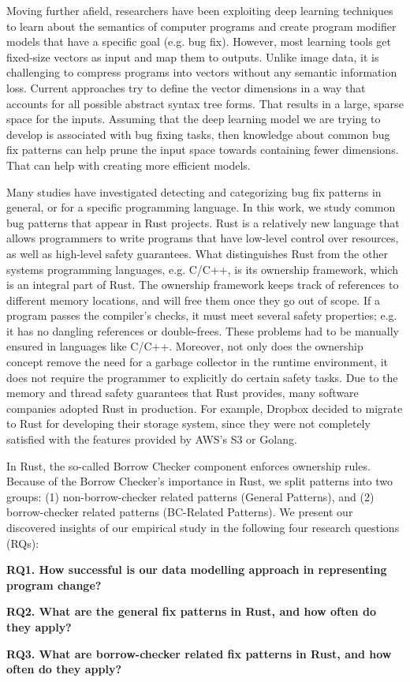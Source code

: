 Moving further afield, researchers have been exploiting deep learning techniques to learn about the semantics of computer programs and create program modifier models that have a specific goal (e.g. bug fix). However, most learning tools get fixed-size vectors as input and map them to outputs. Unlike image data, it is challenging to compress programs into vectors without any semantic information loss. Current approaches try to define the vector dimensions in a way that accounts for all possible abstract syntax tree forms. That results in a large, sparse space for the inputs. Assuming that the deep learning model we are trying to develop is associated with bug fixing tasks, then knowledge about common bug fix patterns can help prune the input space towards containing fewer dimensions. That can help with creating more efficient models.


Many studies have investigated detecting and categorizing bug fix patterns in general, or for a specific programming language. In this work, we study common bug patterns that appear in Rust projects. Rust is a relatively new language that allows programmers to write programs that have low-level control over resources, as well as high-level safety guarantees. What distinguishes Rust from the other systems programming languages, e.g. C/C++, is its ownership framework, which is an integral part of Rust. The ownership framework keeps track of references to different memory locations, and will free them once they go out of scope. If a program passes the compiler’s checks, it must meet several safety properties; e.g. it has no dangling references or double-frees. These problems had to be manually ensured in languages like C/C++. Moreover, not only does the ownership concept remove the need for a garbage collector in the runtime environment, it does not require the programmer to explicitly do certain safety tasks. Due to the memory and thread safety guarantees that Rust provides, many software companies adopted Rust in production. For example, Dropbox decided to migrate to Rust for developing their storage system, since they were not completely satisfied with the features provided by AWS’s S3 or Golang.

In Rust, the so-called Borrow Checker component enforces ownership rules. Because of the Borrow Checker's importance in Rust, we split patterns into two groups: (1) non-borrow-checker related patterns (General Patterns), and (2) borrow-checker related patterns (BC-Related Patterns). We present our discovered insights of our empirical study in the following four research
questions (RQs):


\textbf{RQ1. How successful is our data modelling approach in representing program change?} 

\textbf{RQ2. What are the general fix patterns in Rust, and how often do they apply?} 

\textbf{RQ3. What are borrow-checker related fix patterns in Rust, and how often do they apply?}







